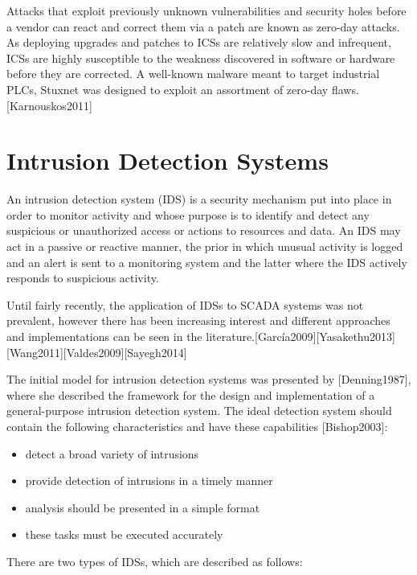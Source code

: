 \documentclass[12pt,]{article}
\begin{document}
Attacks that exploit previously unknown vulnerabilities and security
holes before a vendor can react and correct them via a patch are known
as zero-day attacks. As deploying upgrades and patches to ICSs are
relatively slow and infrequent, ICSs are highly susceptible to the
weakness discovered in software or hardware before they are corrected. A
well-known malware meant to target industrial PLCs, Stuxnet was designed
to exploit an assortment of zero-day flaws.{[}Karnouskos2011{]}

\pagebreak

\section{Intrusion Detection Systems}\label{intrusion-detection-systems}

An intrusion detection system (IDS) is a security mechanism put into
place in order to monitor activity and whose purpose is to identify and
detect any suspicious or unauthorized access or actions to resources and
data. An IDS may act in a passive or reactive manner, the prior in which
unusual activity is logged and an alert is sent to a monitoring system
and the latter where the IDS actively responds to suspicious activity.

Until fairly recently, the application of IDSs to SCADA systems was not
prevalent, however there has been increasing interest and different
approaches and implementations can be seen in the
literature.{[}García2009{]}{[}Yasakethu2013{]}
{[}Wang2011{]}{[}Valdes2009{]}{[}Sayegh2014{]}

The initial model for intrusion detection systems was presented by
{[}Denning1987{]}, where she described the framework for the design and
implementation of a general-purpose intrusion detection system. The
ideal detection system should contain the following characteristics and
have these capabilities {[}Bishop2003{]}:

\begin{itemize}
\itemsep1pt\parskip0pt
\item
  detect a broad variety of intrusions
\item
  provide detection of intrusions in a timely manner
\item
  analysis should be presented in a simple format
\item
  these tasks must be executed accurately
\end{itemize}

There are two types of IDSs, which are described as follows:
\end{document}
